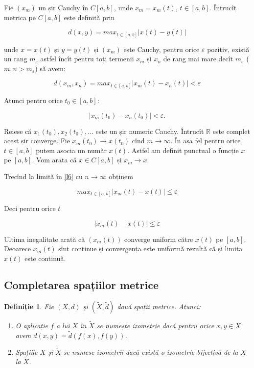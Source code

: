 \documentclass[a4paper,12pt]{article}
\theoremstyle{change}
\newtheorem{definition}[theorem]{Definiție}
\newenvironment{proof}[1][Proof]{\begin{trivlist}
\item[\hskip \labelsep {\bfseries #1}]}{\end{trivlist}}
\begin{document}
\begin{proof}
Fie $(x_m)$ un șir Cauchy în $C[a,b]$, unde $x_m=x_m(t)$, $t\in [a,b]$. Întrucîț metrica pe $C[a,b]$ este definită prin

\[
  d(x,y) = max_{t\in [a,b]} |x(t)-y(t)|
\]

\noindent unde $x=x(t)$ și $y=y(t)$ și $(x_m)$ este Cauchy, pentru orice $\varepsilon$ pozitiv, există un rang $m_{\varepsilon}$ astfel încît pentru toți termenii $x_m$ și $x_n$ de rang mai mare decît $m_{\varepsilon}$ ($m,n>m_{\varepsilon}$) să avem:

\[
\label{l6}
d(x_m,x_n) = max_{t\in [a,b]} |x_m(t)-x_n(t)|<\varepsilon
\]

Atunci pentru orice $t_0\in [a,b]$:

\[
|x_m(t_0)-x_n(t_0)|<\varepsilon.
\]

Reiese că $x_1(t_0),x_2(t_0),...$ este un șir numeric Cauchy. Întrucît $\mathbb{R}$ este complet acest șir converge. Fie $x_m(t_0)\to x(t_0)$ cînd $m\to\infty$. În așa fel pentru orice $t\in[a,b]$ putem asocia un număr $x(t)$. Astfel am definit punctual o funcție $x$ pe $[a,b]$. Vom arata că $x\in C[a,b]$ și $x_m\to x$.

Trecînd la limită în \eqref{l6} cu $n\to\infty$ obținem

\[
max_{t\in [a,b]} |x_m(t)-x(t)|\leq \varepsilon
\]

Deci pentru orice $t$

\[
|x_m(t)-x(t)|\leq \varepsilon
\]

Ultima inegalitate arată că $(x_m(t))$ converge uniform către $x(t)$ pe $[a,b]$. Deoarece $x_m(t)$ sînt continue și convergența este uniformă rezultă că și limita $x(t)$ este continuă.
\end{proof}



\subsection{Completarea spațiilor metrice}

\begin{definition}
Fie $(X,d)$ și $(\tilde{X}, \tilde{d})$ două spații metrice. Atunci:
\begin{enumerate}
\item O aplicație $f$ a lui $X$ în $\tilde{X}$ se numește izometrie dacă pentru orice $x,y\in X$ avem $d(x,y)=\tilde{d}(f(x),f(y))$.
\item Spațiile $X$ și $\tilde{X}$ se numesc izometrii dacă există o izometrie bijectivă de la $X$ la $\tilde{X}$.
\end{enumerate} 
\end{definition}
\end{document}
